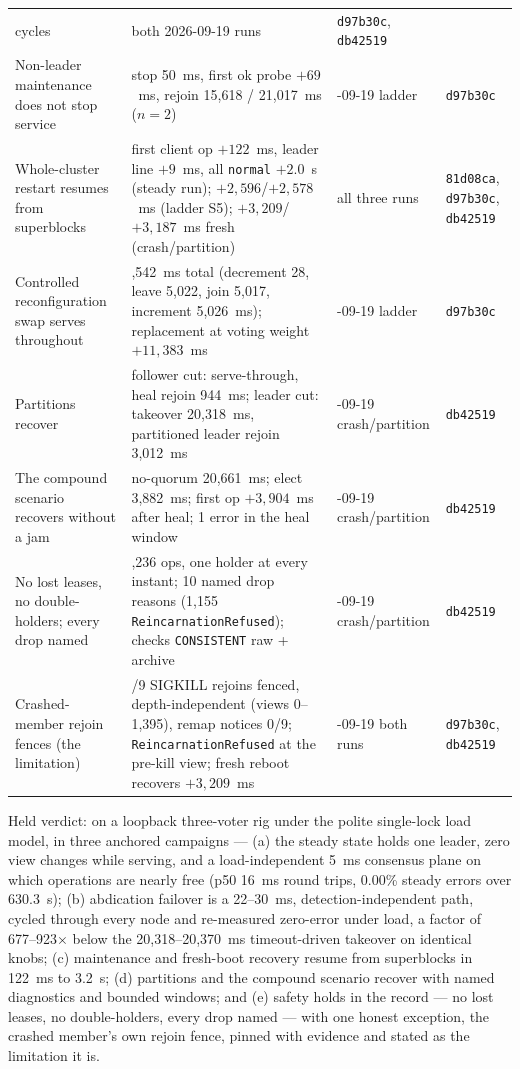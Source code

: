 \documentclass[10pt,journal,letterpaper]{IEEEtran}
\newcommand{\code}[1]{\texttt{\small #1}}
\begin{document}
\begin{table}[t]
\begin{tabular}{>{\raggedright\arraybackslash}p{44mm}>{\raggedright\arraybackslash}p{50mm}>{\raggedright\arraybackslash}p{20mm}>{\raggedright\arraybackslash}p{30mm}}
cycles & both 2026-09-19 runs & \code{d97b30c}, \code{db42519} \\
Non-leader maintenance does not stop service & stop 50~ms, first ok probe
$+69$~ms, rejoin 15{,}618 / 21{,}017~ms ($n=2$) & 2026-09-19 ladder &
\code{d97b30c} \\
Whole-cluster restart resumes from superblocks & first client op
$+122$~ms, leader line $+9$~ms, all \code{normal} $+2.0$~s (steady run);
$+2{,}596$/$+2{,}578$~ms (ladder S5); $+3{,}209$/$+3{,}187$~ms fresh
(crash/partition) & all three runs & \code{81d08ca}, \code{d97b30c},
\code{db42519} \\
Controlled reconfiguration swap serves throughout & 23,542~ms total
(decrement 28, leave 5,022, join 5,017, increment 5,026~ms); replacement
at voting weight $+11{,}383$~ms & 2026-09-19 ladder & \code{d97b30c} \\
Partitions recover & follower cut: serve-through, heal rejoin 944~ms;
leader cut: takeover 20,318~ms, partitioned leader rejoin 3,012~ms &
2026-09-19 crash/partition & \code{db42519} \\
The compound scenario recovers without a jam & no-quorum 20,661~ms; elect
3,882~ms; first op $+3{,}904$~ms after heal; 1 error in the heal window &
2026-09-19 crash/partition & \code{db42519} \\
No lost leases, no double-holders; every drop named & 11,236 ops, one
holder at every instant; 10 named drop reasons (1,155
\code{ReincarnationRefused}); checks \code{CONSISTENT} raw + archive &
2026-09-19 crash/partition & \code{db42519} \\
Crashed-member rejoin fences (the limitation) & 9/9 SIGKILL rejoins
fenced, depth-independent (views 0--1,395), remap notices 0/9;
\code{ReincarnationRefused} at the pre-kill view; fresh reboot recovers
$+3{,}209$~ms & 2026-09-19 both runs & \code{d97b30c}, \code{db42519} \\
\bottomrule
\end{tabular}
\end{table}

Held verdict: on a loopback three-voter rig under the polite single-lock
load model, in three anchored campaigns --- (a) the steady state holds one
leader, zero view changes while serving, and a load-independent 5~ms
consensus plane on which operations are nearly free (p50 16~ms round
trips, 0.00\% steady errors over 630.3~s); (b) abdication failover is a
22--30~ms, detection-independent path, cycled through every node and
re-measured zero-error under load, a factor of 677--923$\times$ below the
20,318--20,370~ms timeout-driven takeover on identical knobs; (c)
maintenance and fresh-boot recovery resume from superblocks in 122~ms to
3.2~s; (d) partitions and the compound scenario recover with named
diagnostics and bounded windows; and (e) safety holds in the record --- no
lost leases, no double-holders, every drop named --- with one honest
exception, the crashed member's own rejoin fence, pinned with evidence and
stated as the limitation it is.
\end{document}
